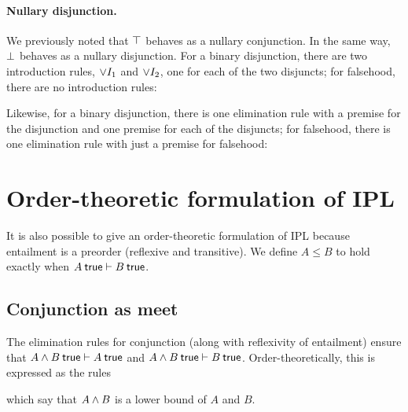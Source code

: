 \documentclass[12pt]{article}
\begin{document}
\paragraph{Nullary disjunction.}\label{sec:nullary-disjunction}
We previously noted that $\top$ behaves as a nullary conjunction.
In the same way, $\bot$ behaves as a nullary disjunction.
For a binary disjunction, there are two introduction rules, ${\vee}I_1$ and ${\vee}I_2$, one for each of the two disjuncts; for falsehood, there are no introduction rules:
Likewise, for a binary disjunction, there is one elimination rule with a premise for the disjunction and one premise for each of the disjuncts; for falsehood, there is one elimination rule with just a premise for falsehood:

\section{Order-theoretic formulation of \acl{IPL}}\label{sec:ipl_order}

It is also possible to give an order-theoretic formulation of \ac{IPL} because entailment is a preorder (reflexive and transitive).
We define $A \leq B$ to hold exactly when $A \true \entails B \true$.

\subsection{Conjunction as meet}\label{sec:conjunction-as-meet}

The elimination rules for conjunction (along with reflexivity of entailment) ensure that $A \conj B \true \entails A \true$ and $A \conj B \true \entails B \true$.
Order-theoretically, this is expressed as the rules
which say that $A \wedge B$ is a lower bound of $A$ and $B$.
\end{document}
